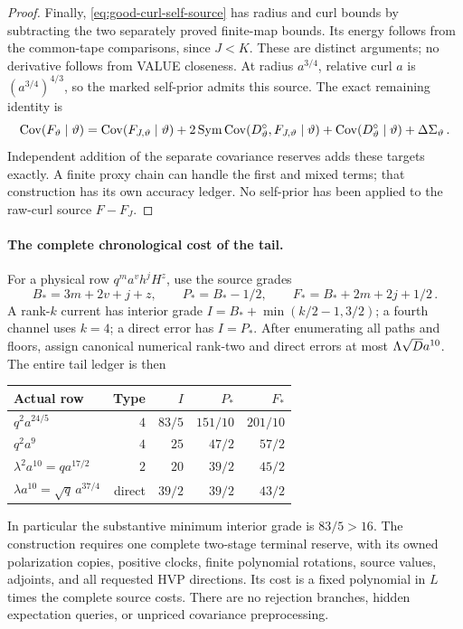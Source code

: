 \documentclass[11pt]{article}
\numberwithin{equation}{section}
\theoremstyle{remark}\newtheorem{remark}[theorem]{Remark}
\newcommand{\Sym}{\operatorname{Sym}}\newcommand{\HS}{\mathrm{HS}}
\begin{document}
\begin{proof}
Finally, \eqref{eq:good-curl-self-source} has radius and curl bounds
by subtracting the two separately proved finite-map bounds. Its
energy follows from the common-tape comparisons, since $J<K$.
These are distinct arguments; no derivative follows from VALUE
closeness. At radius $a^{3/4}$, relative curl $a$ is
$(a^{3/4})^{4/3}$, so the marked self-prior admits this source.
The exact remaining identity is
\[
 \Cov(F_\vartheta\mid\vartheta)
 =\Cov(F_{J,\vartheta}\mid\vartheta)
   +2\Sym\Cov(D^\circ_\vartheta,F_{J,\vartheta}\mid\vartheta)
   +\Cov(D^\circ_\vartheta\mid\vartheta)
   +\Delta\Sigma_\vartheta\,.
\]
Independent addition of the separate covariance reserves adds these
targets exactly. A finite proxy chain can handle the first and mixed
terms; that construction has its own accuracy ledger. No self-prior
has been applied to the raw-curl source $F-F_J$.
\end{proof}

\paragraph{The complete chronological cost of the tail.}
For a physical row $q^m a^v h^jH^z$, use the source grades
\[
 B_*=3m+2v+j+z,\qquad P_*=B_*-1/2,\qquad
 F_*=B_*+2m+2j+1/2\,.
\]
A rank-$k$ current has interior grade
$I=B_*+\min(k/2-1,3/2)$; a fourth channel uses $k=4$;
a direct error has $I=P_*$. After enumerating all paths and floors,
assign canonical numerical rank-two and direct errors at most
$\Lambda\sqrt D a^{10}$. The entire tail ledger is then
\begin{center}
\begin{tabular}{lrrrr}
\toprule
Actual row & Type & $I$ & $P_*$ & $F_*$\\
\midrule
$q^2a^{24/5}$ & $4$ & $83/5$ & $151/10$ & $201/10$\\
$q^2a^9$ & $4$ & $25$ & $47/2$ & $57/2$\\
$\lambda^2a^{10}=qa^{17/2}$ & $2$ & $20$ & $39/2$ & $45/2$\\
$\lambda a^{10}=\sqrt q\,a^{37/4}$ & direct & $39/2$ & $39/2$ & $43/2$\\
\bottomrule
\end{tabular}
\end{center}
In particular the substantive minimum interior grade is $83/5>16$.
The construction requires one complete two-stage terminal reserve,
with its owned polarization copies, positive clocks, finite polynomial
rotations, source values, adjoints, and all requested HVP directions.
Its cost is a fixed polynomial in $L$ times the complete source costs.
There are no rejection branches, hidden expectation queries, or
unpriced covariance preprocessing. 
\end{document}
